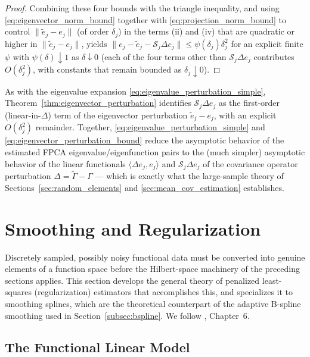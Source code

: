 \begin{proof}
Combining these four bounds with the triangle inequality, and using
\eqref{eq:eigenvector_norm_bound} together with
\eqref{eq:projection_norm_bound} to control $\|\widetilde{e}_j-e_j\|$ (of
order $\delta_j$) in the terms (ii) and (iv) that are quadratic or higher
in $\|\widetilde{e}_j-e_j\|$, yields $\|e_j-\widetilde{e}_j-\mathcal{S}_j
\Delta e_j\| \leq \psi(\delta_j)\delta_j^2$ for an explicit finite $\psi$
with $\psi(\delta)\downarrow 1$ as $\delta\downarrow 0$ (each of the four
terms other than $\mathcal{S}_j\Delta e_j$ contributes $O(\delta_j^2)$,
with constants that remain bounded as $\delta_j\downarrow 0$).
\end{proof}

As with the eigenvalue expansion \eqref{eq:eigenvalue_perturbation_simple},
Theorem~\ref{thm:eigenvector_perturbation} identifies $\mathcal{S}_j\Delta
e_j$ as the first-order (linear-in-$\Delta$) term of the eigenvector
perturbation $\widetilde{e}_j-e_j$, with an explicit $O(\delta_j^2)$
remainder. Together, \eqref{eq:eigenvalue_perturbation_simple} and
\eqref{eq:eigenvector_perturbation_bound} reduce the asymptotic behavior of
the estimated FPCA eigenvalue/eigenfunction pairs to the (much simpler)
asymptotic behavior of the linear functionals $\langle\Delta e_j,e_j
\rangle$ and $\mathcal{S}_j\Delta e_j$ of the covariance operator
perturbation $\Delta=\widetilde{\Gamma}-\Gamma$ --- which is exactly what
the large-sample theory of Sections~\ref{sec:random_elements} and
\ref{sec:mean_cov_estimation} establishes.

\section{Smoothing and Regularization}
\label{sec:smoothing}

Discretely sampled, possibly noisy functional data must be converted into
genuine elements of a function space before the Hilbert-space machinery of
the preceding sections applies. This section develops the general theory of
penalized least-squares (regularization) estimators that accomplishes this,
and specializes it to smoothing splines, which are the theoretical
counterpart of the adaptive B-spline smoothing used in
Section~\ref{subsec:bspline}. We follow \cite{hsingeubank2015}, Chapter~6.

\subsection{The Functional Linear Model}
\label{subsec:functional_linear_model}

